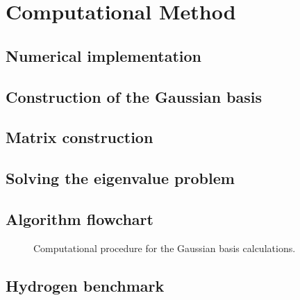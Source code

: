 
\chapter{Computational Method}

\section{Numerical implementation}



\section{Construction of the Gaussian basis}


\section{Matrix construction}

\section{Solving the eigenvalue problem}

\section{Algorithm flowchart}

\begin{figure}[htbp]
\centering
{}
\caption{Computational procedure for
the Gaussian basis calculations.}
\label{fig:algorithm}
\end{figure}



\section{Hydrogen benchmark}


